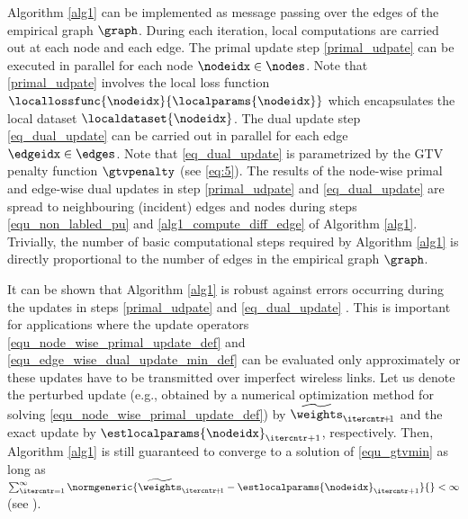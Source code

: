 \documentclass[lettersize,journal]{IEEEtran}
\begin{document}
Algorithm \ref{alg1} can be implemented as message passing over the edges of the empirical graph $\graph$. 
During each iteration, local computations are carried out at each node and each edge. The primal update step 
\eqref{primal_udpate} can be executed in parallel for each node $\nodeidx \in \nodes$. Note that \eqref{primal_udpate} 
involves the local loss function $\locallossfunc{\nodeidx}{\localparams{\nodeidx}}$ which encapsulates the local dataset $\localdataset{\nodeidx}$. 
The dual update step \eqref{eq_dual_update} can be carried out in parallel for each edge $\edgeidx \in \edges$. Note 
that \eqref{eq_dual_update} is parametrized by the GTV penalty function $\gtvpenalty$ (see \eqref{eq:5}). 
The results of the node-wise primal and edge-wise dual updates in step \eqref{primal_udpate} and \eqref{eq_dual_update} 
are spread to neighbouring (incident) edges and nodes during steps \eqref{equ_non_labled_pu} and \eqref{alg1_compute_diff_edge} 
of Algorithm \ref{alg1}. Trivially, the number of basic computational steps required by Algorithm \ref{alg1} is directly 
proportional to the number of edges in the empirical graph $\graph$.  



It can be shown that Algorithm \ref{alg1} is robust against errors occurring during the updates 
in steps \eqref{primal_udpate} and \eqref{eq_dual_update} \cite{Rasch:2020tx,Condat2013}. This is 
important for applications where the update operators \eqref{equ_node_wise_primal_update_def} and \eqref{equ_edge_wise_dual_update_min_def} 
can be evaluated only approximately or these updates have to be transmitted over imperfect wireless links.
Let us denote the perturbed update (e.g., obtained 
by a numerical optimization method for solving \eqref{equ_node_wise_primal_update_def}) 
by $\widetilde{{\weights}}_{\itercntr\!+\!1}$ and the exact update by $\estlocalparams{\nodeidx}_{\itercntr+1}$, respectively. 
Then, Algorithm \ref{alg1} is still guaranteed to converge to a solution of \eqref{equ_gtvmin} as long as $\sum_{\itercntr=1}^{\infty} \normgeneric{\widetilde{{\weights}}_{\itercntr\!+\!1} -\estlocalparams{\nodeidx}_{\itercntr+1}}{} < \infty$  (see \cite[Sec.\ 3]{Condat2013}).  
\end{document}
